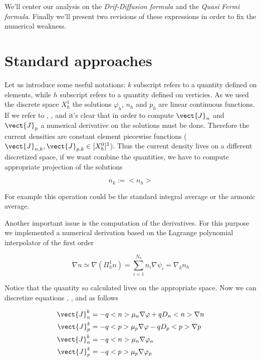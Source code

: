 We'll center our analysis on the \textit{Drif-Diffusion formula} and the \textit{Quasi Fermi formula}. Finally we'll present two revisions of these expressions in order to fix the numerical weakness.

\section{Standard approaches}

Let us introduce some useful notations: $k$ subscript refers to a quantity defined on elements, while $h$ subscript refers to a quantity defined on verticies. As we used the discrete space $X_h^1$ the solutions $\varphi_h$, $n_h$ and $p_h$ are linear continuous functions. If we refer to , ,  and  it's clear that in order to compute $\vect{J}_n$ and $\vect{J}_p$ a numerical derivative on the solutions must be done. Therefore the current densities are constant element piecewise functions ($\vect{J}_{n,k},\vect{J}_{p,k} \in [X_h^0]^3$). 
Thus the current density lives on a different discretized space, if we want combine the quantities, we have to compute appropriate projection of the solutions
 
 \begin{equation}
 n_k := <n_h>
 \end{equation}

For example this operation could be the standard integral average or the armonic average. 

Another important issue is the computation of the derivatives. For this purpose we implemented a numerical derivation based on the Lagrange polynomial interpolator of the first order

\begin{equation}
\nabla n \simeq \nabla (\Pi^1_h n) = \sum_{i=1}^{N_h} n_i \nabla \psi_i = \nabla_k n_h
\end{equation}
 
Notice that the quantity so calculated lives on the appropriate space.
Now we can discretize equations , ,  and  as follows

\begin{align}
\vect{J}_n^k &= -q<n>\mu_n\nabla \varphi + qD_n <n>\nabla n \label{eq: Jn DD discrete}\\ 
\vect{J}_p^k &= -q<p>\mu_p\nabla \varphi - qD_p <p> \nabla p \label{eq: Jp DD discrete} \\
\vect{J}_n^k &= -q<n>\mu_n\nabla \varphi_n \label{eq: Jn qf discrete}\\
\vect{J}_p^k &= -q<p>\mu_p\nabla \varphi_p \label{eq: Jp qf discrete}
\end{align}
 
